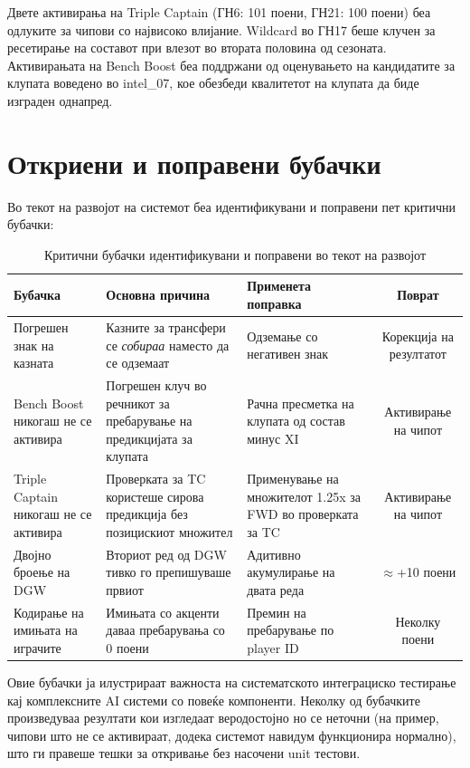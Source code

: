Двете активирања на Triple Captain (ГН6: 101 поени, ГН21: 100 поени) беа одлуките за чипови со највисоко влијание. Wildcard во ГН17 беше клучен за ресетирање на составот при влезот во втората половина од сезоната. Активирањата на Bench Boost беа поддржани од оценувањето на кандидатите за клупата воведено во intel\_07, кое обезбеди квалитетот на клупата да биде изграден однапред.

\section{Откриени и поправени бубачки}

Во текот на развојот на системот беа идентификувани и поправени пет критични бубачки:

\begin{table}[h]
\centering
\caption{Критични бубачки идентификувани и поправени во текот на развојот}
\label{tab:bugs_mk}
\begin{tabular}{p{3cm}p{3.5cm}p{3.5cm}c}
\toprule
\textbf{Бубачка} & \textbf{Основна причина} & \textbf{Применета поправка} & \textbf{Поврат} \\
\midrule
Погрешен знак на казната & Казните за трансфери се \textit{собираа} наместо да се одземаат & Одземање со негативен знак & Корекција на резултатот \\
Bench Boost никогаш не се активира & Погрешен клуч во речникот за пребарување на предикцијата за клупата & Рачна пресметка на клупата од состав минус XI & Активирање на чипот \\
Triple Captain никогаш не се активира & Проверката за TC користеше сирова предикција без позицискиот множител & Применување на множителот 1.25x за FWD во проверката за TC & Активирање на чипот \\
Двојно броење на DGW & Вториот ред од DGW тивко го препишуваше првиот & Адитивно акумулирање на двата реда & $\approx$+10 поени \\
Кодирање на имињата на играчите & Имињата со акценти даваа пребарувања со 0 поени & Премин на пребарување по player ID & Неколку поени \\
\bottomrule
\end{tabular}
\end{table}

Овие бубачки ја илустрираат важноста на систематското интеграциско тестирање кај комплексните AI системи со повеќе компоненти. Неколку од бубачките произведуваа резултати кои изгледаат веродостојно но се неточни (на пример, чипови што не се активираат, додека системот навидум функционира нормално), што ги правеше тешки за откривање без насочени unit тестови.

